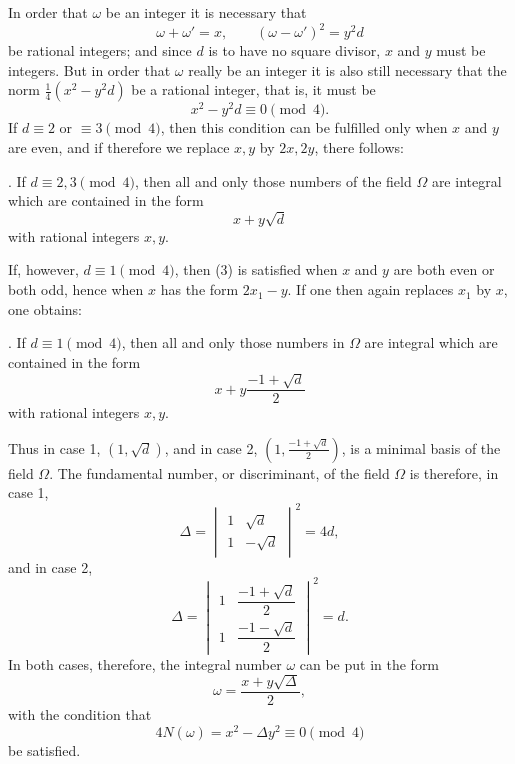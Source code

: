 \documentclass[11pt]{article}
\begin{document}
In order that $\omega$ be an integer it is necessary that
\[
 \omega+\omega'=x,
 \qquad (\omega-\omega')^2=y^2d
\]
be rational integers; and since $d$ is to have no square divisor, $x$ and $y$ must be integers. But in order that $\omega$ really be an integer it is also still necessary that the norm $\frac14(x^2-y^2d)$ be a rational integer, that is, it must be
\begin{equation}
 x^2-y^2d\equiv0\pmod4 .
\tag{4}
\end{equation}
If $d\equiv2$ or $\equiv3\pmod4$, then this condition can be fulfilled only when $x$ and $y$ are even, and if therefore we replace $x,y$ by $2x,2y$, there follows:

\medskip
{}. If $d\equiv2,3\pmod4$, then all and only those numbers of the field $\Omega$ are integral which are contained in the form
\[
 x+y\sqrt d
\]
with rational integers $x,y$.
\medskip

If, however, $d\equiv1\pmod4$, then (3) is satisfied when $x$ and $y$ are both even or both odd, hence when $x$ has the form $2x_1-y$. If one then again replaces $x_1$ by $x$, one obtains:

\medskip
{}. If $d\equiv1\pmod4$, then all and only those numbers in $\Omega$ are integral which are contained in the form
\[
 x+y\frac{-1+\sqrt d}{2}
\]
with rational integers $x,y$.
\medskip

Thus in case 1, $(1,\sqrt d)$, and in case 2, $\left(1,\frac{-1+\sqrt d}{2}\right)$, is a minimal basis of the field $\Omega$. The fundamental number, or discriminant, of the field $\Omega$ is therefore, in case 1,
\begin{equation}
 \Delta=\begin{vmatrix}
 1&\sqrt d\\
 1&-\sqrt d
 \end{vmatrix}^{2}=4d,
\tag{5}
\end{equation}
and in case 2,
\begin{equation}
 \Delta=\begin{vmatrix}
 1&\dfrac{-1+\sqrt d}{2}\\[0.35em]
 1&\dfrac{-1-\sqrt d}{2}
 \end{vmatrix}^{2}=d.
\tag{6}
\end{equation}
In both cases, therefore, the integral number $\omega$ can be put in the form
\begin{equation}
 \omega=\frac{x+y\sqrt\Delta}{2},
\tag{7}
\end{equation}
with the condition that
\begin{equation}
 4N(\omega)=x^2-\Delta y^2\equiv0\pmod4
\tag{8}
\end{equation}
be satisfied.
\end{document}
